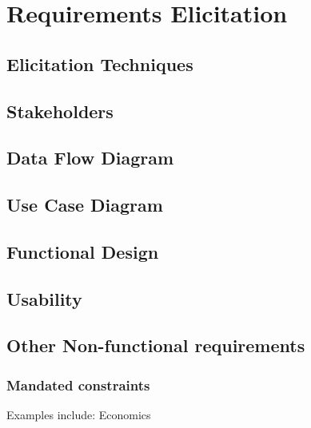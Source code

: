 %
%
\chapter{Requirements Elicitation}

\section{Elicitation Techniques}

\section{Stakeholders}

\section{Data Flow Diagram}

\section{Use Case Diagram}

\section{Functional Design}

\section{Usability}

\section{Other Non-functional requirements}

\subsection{Mandated constraints}

Examples include: Economics

\clearpage